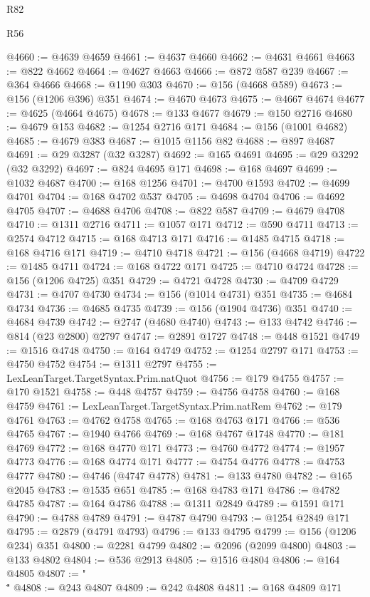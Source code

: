 \begin{lexlean}{R82}
\begin{lexlean}{R56}
\begin{coremodule}
{{{{{{{{{{{{{{{{{{{{{{{{{{{{{{{{{{{{{{{{{{{{{{{{{{{{{{{{{{{{{{{{{{{{{{{{{{{{{{{{{{{{{{{{{{{{{{{{{{{{{{{{{{{{{{{{{{{{{{{{{{{{{{{{{{{{{{{{{{{{{{{{{{{{{{{{{{{{{{{{{{{{{{{{{{{{{{{{{{{{{{{{{{{{{{{{{{{{{{{{{{{{{{{{{{{@4660 := @4639 @4659
@4661 := @4637 @4660
@4662 := @4631 @4661
@4663 := @822 @4662
@4664 := @4627 @4663
@4666 := @872 @587 @239
@4667 := @364 @4666
@4668 := @1190 @303
@4670 := @156 (@4668 @589)
@4673 := @156 (@1206 @396) @351
@4674 := @4670 @4673
@4675 := @4667 @4674
@4677 := @4625 (@4664 @4675)
@4678 := @133 @4677
@4679 := @150 @2716
@4680 := @4679 @153
@4682 := @1254 @2716 @171
@4684 := @156 (@1001 @4682)
@4685 := @4679 @383
@4687 := @1015 @1156 @82
@4688 := @897 @4687
@4691 := @29 @3287 (@32 @3287)
@4692 := @165 @4691
@4695 := @29 @3292 (@32 @3292)
@4697 := @824 @4695 @171
@4698 := @168 @4697
@4699 := @1032 @4687
@4700 := @168 @1256
@4701 := @4700 @1593
@4702 := @4699 @4701
@4704 := @168 @4702 @537
@4705 := @4698 @4704
@4706 := @4692 @4705
@4707 := @4688 @4706
@4708 := @822 @587
@4709 := @4679 @4708
@4710 := @1311 @2716
@4711 := @1057 @171
@4712 := @590 @4711
@4713 := @2574 @4712
@4715 := @168 @4713 @171
@4716 := @1485 @4715
@4718 := @168 @4716 @171
@4719 := @4710 @4718
@4721 := @156 (@4668 @4719)
@4722 := @1485 @4711
@4724 := @168 @4722 @171
@4725 := @4710 @4724
@4728 := @156 (@1206 @4725) @351
@4729 := @4721 @4728
@4730 := @4709 @4729
@4731 := @4707 @4730
@4734 := @156 (@1014 @4731) @351
@4735 := @4684 @4734
@4736 := @4685 @4735
@4739 := @156 (@1904 @4736) @351
@4740 := @4684 @4739
@4742 := @2747 (@4680 @4740)
@4743 := @133 @4742
@4746 := @814 (@23 @2800) @2797
@4747 := @2891 @1727
@4748 := @448 @1521
@4749 := @1516 @4748
@4750 := @164 @4749
@4752 := @1254 @2797 @171
@4753 := @4750 @4752
@4754 := @1311 @2797
@4755 := LexLeanTarget.TargetSyntax.Prim.natQuot
@4756 := @179 @4755
@4757 := @170 @1521
@4758 := @448 @4757
@4759 := @4756 @4758
@4760 := @168 @4759
@4761 := LexLeanTarget.TargetSyntax.Prim.natRem
@4762 := @179 @4761
@4763 := @4762 @4758
@4765 := @168 @4763 @171
@4766 := @536 @4765
@4767 := @1940 @4766
@4769 := @168 @4767 @1748
@4770 := @181 @4769
@4772 := @168 @4770 @171
@4773 := @4760 @4772
@4774 := @1957 @4773
@4776 := @168 @4774 @171
@4777 := @4754 @4776
@4778 := @4753 @4777
@4780 := @4746 (@4747 @4778)
@4781 := @133 @4780
@4782 := @165 @2045
@4783 := @1535 @651
@4785 := @168 @4783 @171
@4786 := @4782 @4785
@4787 := @164 @4786
@4788 := @1311 @2849
@4789 := @1591 @171
@4790 := @4788 @4789
@4791 := @4787 @4790
@4793 := @1254 @2849 @171
@4795 := @2879 (@4791 @4793)
@4796 := @133 @4795
@4799 := @156 (@1206 @234) @351
@4800 := @2281 @4799
@4802 := @2096 (@2099 @4800)
@4803 := @133 @4802
@4804 := @536 @2913
@4805 := @1516 @4804
@4806 := @164 @4805
@4807 := "\\\""
@4808 := @243 @4807
@4809 := @242 @4808
@4811 := @168 @4809 @171
}}}}}}}}}}}}}}}}}}}}}}}}}}}}}}}}}}}}}}}}}}}}}}}}}}}}}}}}}}}}}}}}}}}}}}}}}}}}}}}}}}}}}}}}}}}}}}}}}}}}}}}}}}}}}}}}}}}}}}}}}}}}}}}}}}}}}}}}}}}}}}}}}}}}}}}}}}}}}}}}}}}}}}}}}}}}}}}}}}}}}}}}}}}}}}}}}}}}}}}}}}}}}}}}}}}
\end{coremodule}
\end{lexlean}
\end{lexlean}
